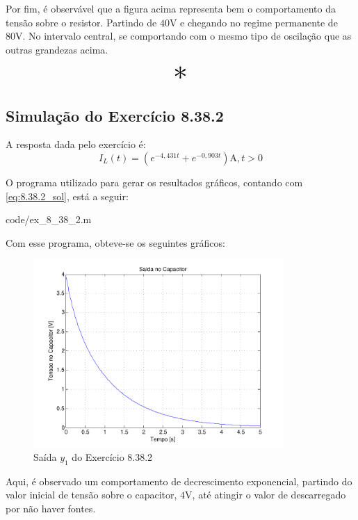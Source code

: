 \documentclass{report}
\begin{document}
Por fim, é observável que a figura acima representa bem o comportamento da tensão sobre o resistor. Partindo de $ 40\text{V} $ e chegando no regime
permanente de $ 80 \text{V} $. No intervalo central, se comportando com o mesmo tipo de oscilação que as outras grandezas acima.

\begin{center}
    \[ \scalebox{3}{$ * $} \]
\end{center}

\subsection{Simulação do Exercício 8.38.2}
A resposta dada pelo exercício é:
$$ I_L(t) = \left(e^{-4,431t} + e^{-0,903t}\right)\text{A}, t > 0 $$

O programa utilizado para gerar os resultados gráficos, contando com \ref{eq:8.38.2_sol}, está a seguir:

                {code/ex_8_38_2.m}

Com esse programa, obteve-se os seguintes gráficos:
\begin{figure}[h!]
    \centering
    \includegraphics[width=0.85\textwidth]{images/plots/plot_8_38_2_y1.pdf}
    \caption{\label{plot:8.38.2_y1} Saída $ y_1 $ do Exercício 8.38.2}
\end{figure}

Aqui, é observado um comportamento de decrescimento exponencial, partindo do valor inicial de tensão
sobre o capacitor, $ 4\text{V} $, até atingir o valor de descarregado por não haver fontes.
\end{document}
